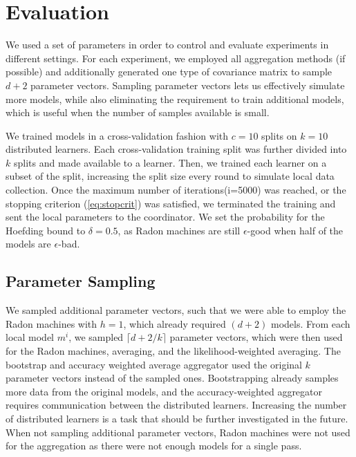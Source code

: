 \section{Evaluation}
\label{sec:experiments}
We used a set of parameters in order to control and evaluate experiments in different settings.
For each experiment, we employed all aggregation methods (if possible) and additionally generated one type of covariance matrix to sample $d+2$ parameter vectors. 
Sampling parameter vectors lets us effectively simulate more models, while also eliminating the requirement to train additional models, which is useful when the number of samples available is small.

We trained models in a cross-validation fashion with $c = 10$ splits on $k=10$ distributed learners.
Each cross-validation training split was further divided into $k$ splits and made available to a learner.
Then, we trained each learner on a subset of the split, increasing the split size every round to simulate local data collection.
Once the maximum number of iterations(i=5000) was reached, or the stopping criterion (\autoref{eq:stopcrit}) was satisfied, we terminated the training and sent the local parameters to the coordinator.
We set the probability for the Hoefding bound to $\delta = 0.5$, as Radon machines are still $\epsilon$-good when half of the models are $\epsilon$-bad.

\subsection{Parameter Sampling}
We sampled additional parameter vectors, such that we were able to employ the Radon machines with $h=1$, which already required $(d+2)$ models.
From each local model $m^i$, we sampled $\lceil d+2/k \rceil$ parameter vectors, which were then used for the Radon machines, averaging, and the likelihood-weighted averaging.
The bootstrap and accuracy weighted average aggregator used the original $k$ parameter vectors instead of the sampled ones.
Bootstrapping already samples more data from the original models, and the accuracy-weighted aggregator requires communication between the distributed learners.
Increasing the number of distributed learners is a task that should be further investigated in the future.
When not sampling additional parameter vectors, Radon machines were not used for the aggregation as there were not enough models for a single pass.


